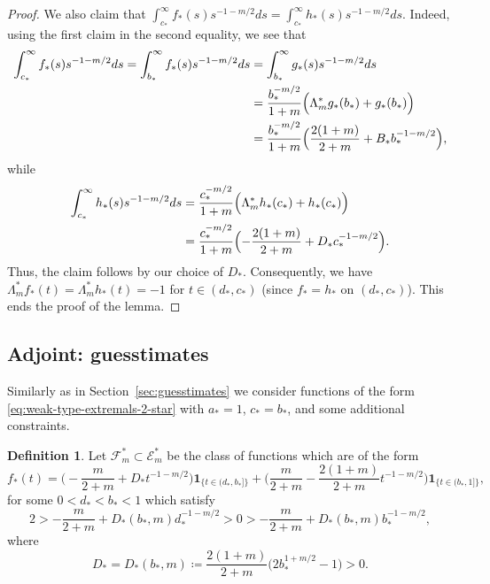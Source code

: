 \documentclass[a4paper]{amsart} %
\theoremstyle{definition}
\newtheorem{definition}[theorem]{Definition}
\theoremstyle{remark}
\numberwithin{equation}{section}
\newcommand*{\ind}[1]{\mathbf{1}_{#1}}
\newcommand*{\indbr}[1]{\ind{\{#1\}}}
\newcommand*{\fclassStar}[1]{\mathcal{E}_{#1}^*}
\newcommand*{\fclassspecStar}[1]{\mathcal{F}_{#1}^*}
\newcommand*{\fStar}{f_{*}}
\newcommand*{\fZeroStar}{g_{*}}
\newcommand*{\fOneStar}{h_{*}}
\newcommand*{\aStar}{a_*}
\newcommand*{\bStar}{b_*}
\newcommand*{\cStar}{c_*}
\newcommand*{\dStar}{d_*}
\newcommand*{\dOneStar}{D_*}%
\newcommand*{\dZeroStar}{B_*}%
\begin{document}
\begin{proof}
	We also claim  that $\int_{\cStar}^\infty \fStar (s) s^{-1-m/2} ds= \int_{\cStar}^\infty \fOneStar (s) s^{-1-m/2} ds$.
	Indeed, using the first claim in the second equality, we see that
	\begin{align*}
	\int_{\cStar}^\infty \fStar (s) s^{-1-m/2} ds
	=
	\int_{\bStar}^\infty \fStar(s) s^{-1-m/2} ds
	&=
	\int_{\bStar}^\infty \fZeroStar(s) s^{-1-m/2} ds\\
	&=
	\frac{\bStar^{-m/2}}{1+m} \Bigl(\Lambda_m^* \fZeroStar (\bStar) + \fZeroStar(\bStar) \Bigr)\\
	&=\frac{\bStar^{-m/2}}{1+m} \Bigl( \frac{2(1+m)}{2+m} + \dZeroStar \bStar^{-1-m/2} \Bigr),
	\end{align*}
	while
	\begin{align*}
	\int_{\cStar}^\infty \fOneStar (s) s^{-1-m/2} ds
	&=
	\frac{\cStar^{-m/2}}{1+m} \Bigl(\Lambda_m^* \fOneStar(\cStar) + \fOneStar(\cStar) \Bigr)\\
	&=\frac{\cStar^{-m/2}}{1+m} \Bigl(-\frac{2(1+m)}{2+m} + \dOneStar \cStar^{-1-m/2} \Bigr).
	\end{align*}
	Thus, the claim follows by our choice of $\dOneStar$.
	Consequently, we have $ \Lambda_m^* \fStar(t) = \Lambda_m^* \fOneStar(t) = - 1$ for $t\in(\dStar,\cStar)$
	(since $\fStar=\fOneStar$ on $(\dStar,\cStar)$). 
	This ends the proof of the lemma. 
\end{proof}








\subsection{Adjoint: guesstimates}

\label{sec:guesstimates-star}

Similarly as in Section~\ref{sec:guesstimates} we consider functions of the form \eqref{eq:weak-type-extremals-2-star} with $\aStar = 1$, $\cStar = \bStar$, and some additional constraints.

\begin{definition}
	\label{def:f-class-spec-star}
	Let $\fclassspecStar{m}\subset \fclassStar{m}$ be the class of functions
	which are of the form
	\[
	\fStar(t) = \bigl(-\frac{m}{2+m} + \dOneStar t^{-1 -m/2}\bigr) \indbr{t\in (\dStar,\bStar]}
	+  \bigl( \frac{m}{2+m} -\frac{2(1+m)}{2+m} t^{-1-m/2}\bigr)\indbr{t\in(\bStar,1]},
	\]
	for some $0< \dStar < \bStar < 1$ which satisfy
	\begin{equation}
	\label{eq:constraint-for-special-b-d-star} 
	2 > -\frac{m}{2+m} + \dOneStar (\bStar,m) \dStar^{-1-m/2}
	>  0 >  -\frac{m}{2+m} + \dOneStar(\bStar,m) \bStar ^{-1-m/2},
	\end{equation}
	where 
	\[
	\dOneStar = \dOneStar (\bStar,m)  \coloneqq \frac{2(1+m)}{2+m} \bigl(2 \bStar^{1+m/2} - 1 \bigr) >0.
	\]
\end{definition}
\end{document}
